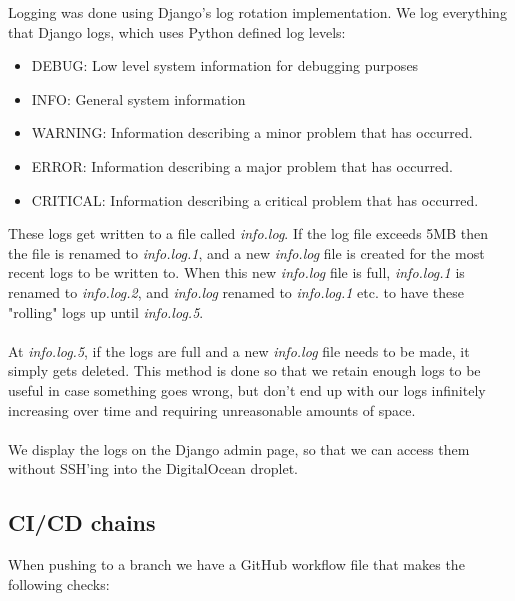 Logging was done using Django's log rotation implementation. We log everything that Django logs, which uses Python defined log levels:

\begin{itemize}
    \item DEBUG: Low level system information for debugging purposes
    \item INFO: General system information
    \item WARNING: Information describing a minor problem that has occurred.
    \item ERROR: Information describing a major problem that has occurred.
    \item CRITICAL: Information describing a critical problem that has occurred.
\end{itemize}

These logs get written to a file called \textit{info.log}. If the log file exceeds 5MB then the file is renamed to \textit{info.log.1}, and a new \textit{info.log} file is created for the most recent logs to be written to. When this new \textit{info.log} file is full, \textit{info.log.1} is renamed to \textit{info.log.2}, and \textit{info.log} renamed to \textit{info.log.1} etc. to have these "rolling" logs up until \textit{info.log.5}.
\\\\
At \textit{info.log.5}, if the logs are full and a new \textit{info.log} file needs to be made, it simply gets deleted. This method is done so that we retain enough logs to be useful in case something goes wrong, but don't end up with our logs infinitely increasing over time and requiring unreasonable amounts of space.
\\\\
We display the logs on the Django admin page, so that we can access them without SSH'ing into the DigitalOcean droplet.

\subsection{CI/CD chains}


When pushing to a branch we have a GitHub workflow file that makes the following checks:

